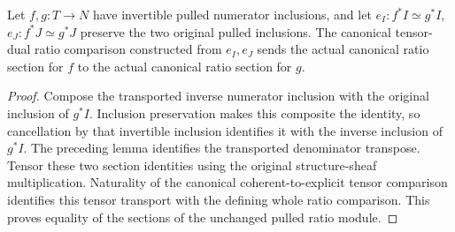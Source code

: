 \begin{theorem}
\label{thm:original-pl-canonical-ratio-section-transport}
\leanok
{}
Let $f,g:T\to N$ have invertible pulled numerator inclusions, and
let $e_I:f^*I\simeq g^*I$, $e_J:f^*J\simeq g^*J$ preserve the two
original pulled inclusions. The canonical tensor-dual ratio comparison
constructed from $e_I,e_J$ sends the actual canonical ratio section
for $f$ to the actual canonical ratio section for $g$.
\end{theorem}
\begin{proof}
Compose the transported inverse numerator inclusion with the original
inclusion of $g^*I$. Inclusion preservation makes this composite the
identity, so cancellation by that invertible inclusion identifies it
with the inverse inclusion of $g^*I$. The preceding lemma identifies
the transported denominator transpose. Tensor these two section
identities using the original structure-sheaf multiplication. Naturality
of the canonical coherent-to-explicit tensor comparison identifies
this tensor transport with the defining whole ratio comparison. This
proves equality of the sections of the unchanged pulled ratio module.
\end{proof}

